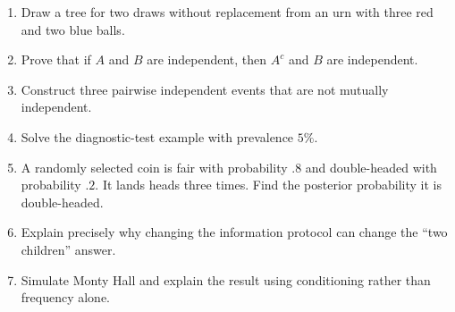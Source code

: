 \begin{exercisebox}
\begin{enumerate}
  \item Draw a tree for two draws without replacement from an urn with three red and two blue balls. 
  \item Prove that if $A$ and $B$ are independent, then $A^c$ and $B$ are independent. 
  \item Construct three pairwise independent events that are not mutually independent. 
  \item Solve the diagnostic-test example with prevalence $5\%$. 
  \item A randomly selected coin is fair with probability $.8$ and double-headed with probability $.2$. It lands heads three times. Find the posterior probability it is double-headed. 
  \item Explain precisely why changing the information protocol can change the ``two children'' answer. 
  \item Simulate Monty Hall and explain the result using conditioning rather than frequency alone. 
\end{enumerate}
\end{exercisebox}
